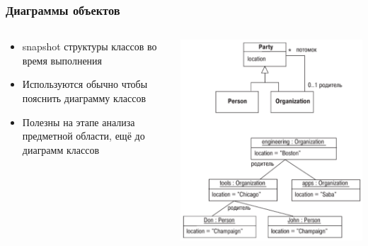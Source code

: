 \documentclass[xetex,mathserif,serif]{beamer}
\begin{document}
	\begin{frame}
		\frametitle{Диаграммы объектов}
				\begin{columns}
			\begin{column}{0.5\textwidth}
				\begin{itemize}
					\item snapshot структуры классов во время выполнения
					\item Используются обычно чтобы пояснить диаграмму классов
					\item Полезны на этапе анализа предметной области, ещё до диаграмм классов
				\end{itemize}
			\end{column}
			\begin{column}{0.5\textwidth}
				\begin{center}
					\includegraphics[width=\textwidth]{objectsDiagram.png}
				\end{center}
			\end{column}
		\end{columns}
	\end{frame}
\end{document}
